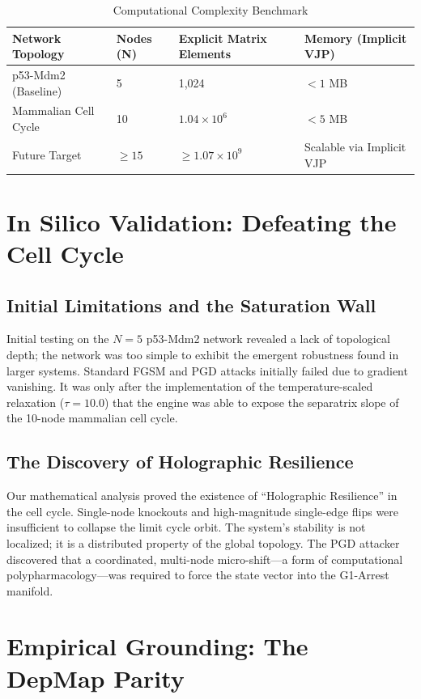 \documentclass[11pt,a4paper]{article}
\begin{document}
\begin{table}[h!]
\centering
\caption{Computational Complexity Benchmark}
\begin{tabular}{@{}llll@{}}
\toprule
\textbf{Network Topology} & \textbf{Nodes (N)} & \textbf{Explicit Matrix Elements} & \textbf{Memory (Implicit VJP)} \\ \midrule
p53-Mdm2 (Baseline) & 5 & 1,024 & $< 1$ MB \\
Mammalian Cell Cycle & 10 & $1.04 \times 10^6$ & $< 5$ MB \\
Future Target & $\geq 15$ & $\geq 1.07 \times 10^9$ & Scalable via Implicit VJP \\ \bottomrule
\end{tabular}
\end{table}

\section{In Silico Validation: Defeating the Cell Cycle}
\subsection{Initial Limitations and the Saturation Wall}
Initial testing on the $N=5$ p53-Mdm2 network revealed a lack of topological depth; the network was too simple to exhibit the emergent robustness found in larger systems. Standard FGSM and PGD attacks initially failed due to gradient vanishing. It was only after the implementation of the temperature-scaled relaxation ($\tau=10.0$) that the engine was able to expose the separatrix slope of the 10-node mammalian cell cycle.

\subsection{The Discovery of Holographic Resilience}
Our mathematical analysis proved the existence of ``Holographic Resilience'' in the cell cycle. Single-node knockouts and high-magnitude single-edge flips were insufficient to collapse the limit cycle orbit. The system's stability is not localized; it is a distributed property of the global topology. The PGD attacker discovered that a coordinated, multi-node micro-shift—a form of computational polypharmacology—was required to force the state vector into the G1-Arrest manifold.

\section{Empirical Grounding: The DepMap Parity}
\end{document}
